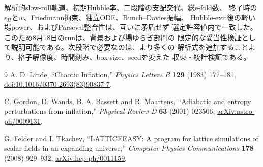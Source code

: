 \documentclass[a4paper,11pt]{ltjsarticle}
\begin{document}
解析的slow-roll軌道、初期Hubble率、二段階の支配交代、総e-fold数、
終了時の$\epsilon_H$と$w$、Friedmann拘束、独立ODE、Bunch--Davies振幅、
Hubble-exit後の軽い場power、およびParseval整合性は、互いに矛盾せず
選定許容値内で一致した。このため8月18日のrunは、背景および場ゆらぎ部門の
限定的な妥当性検証として説明可能である。次段階で必要なのは、より多くの
解析式を追加することより、格子解像度、時間刻み、box size、seedを変えた
収束・統計検証である。

\begin{thebibliography}{9}
A. D. Linde,
``Chaotic Inflation,''
\textit{Physics Letters B} \textbf{129} (1983) 177--181,
\href{https://doi.org/10.1016/0370-2693(83)90837-7}{doi:10.1016/0370-2693(83)90837-7}.

C. Gordon, D. Wands, B. A. Bassett and R. Maartens,
``Adiabatic and entropy perturbations from inflation,''
\textit{Physical Review D} \textbf{63} (2001) 023506,
\href{https://arxiv.org/abs/astro-ph/0009131}{arXiv:astro-ph/0009131}.

G. Felder and I. Tkachev,
``LATTICEEASY: A program for lattice simulations of scalar fields in an expanding universe,''
\textit{Computer Physics Communications} \textbf{178} (2008) 929--932,
\href{https://arxiv.org/abs/hep-ph/0011159}{arXiv:hep-ph/0011159}.
\end{thebibliography}
\end{document}
